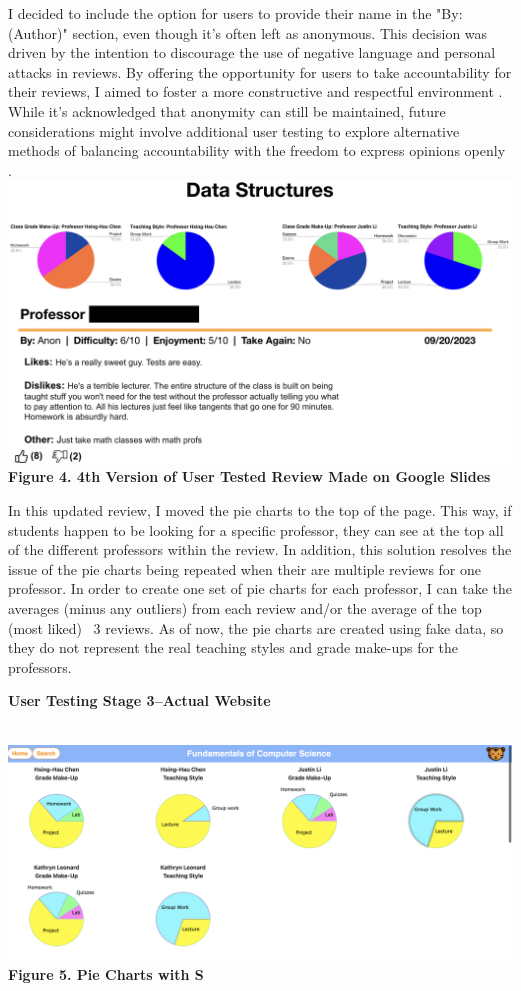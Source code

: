 \documentclass[10pt,twocolumn]{article}
\begin{document}
I decided to include the option for users to provide their name in the "By: (Author)" section, even though it's often left as anonymous. This decision was driven by the intention to discourage the use of negative language and personal attacks in reviews. By offering the opportunity for users to take accountability for their reviews, I aimed to foster a more constructive and respectful environment \cite{ellis1984}. While it's acknowledged that anonymity can still be maintained, future considerations might involve additional user testing to explore alternative methods of balancing accountability with the freedom to express opinions openly .\\


\includegraphics[scale=.27]{UT4}\\ \textbf{\footnotesize{Figure 4. 4th Version of User Tested Review Made on Google Slides}}

In this updated review, I moved the pie charts to the top of the page. This way, if students happen to be looking for a specific professor, they can see at the top all of the different professors within the review. In addition, this solution resolves the issue of the pie charts being repeated when their are multiple reviews for one professor. In order to create one set of pie charts for each professor, I can take the averages (minus any outliers) from each review and/or the average of the top (most liked) ~3 reviews. As of now, the pie charts are created using fake data, so they do not represent the real teaching styles and grade make-ups for the professors. \\


{\centering \textbf{User Testing Stage 3--Actual Website}\par}\\


\includegraphics[scale=.165]{UT5}\\ \textbf{\footnotesize{Figure 5. Pie Charts with S}}\\
\end{document}
